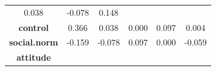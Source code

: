 \documentclass[]{article}
\theoremstyle{definition}
\theoremstyle{definition}
\theoremstyle{definition}
\theoremstyle{remark}
\begin{document}
\begin{longtable}[]{@{}cccccc@{}}
\begin{minipage}[t]{0.11\columnwidth}
0.038\strut
\end{minipage} & \begin{minipage}[t]{0.15\columnwidth}\centering\strut
-0.078\strut
\end{minipage} & \begin{minipage}[t]{0.11\columnwidth}\centering\strut
0.148\strut
\end{minipage}\tabularnewline
\begin{minipage}[t]{0.20\columnwidth}\centering\strut
\textbf{control}\strut
\end{minipage} & \begin{minipage}[t]{0.13\columnwidth}\centering\strut
0.366\strut
\end{minipage} & \begin{minipage}[t]{0.13\columnwidth}\centering\strut
0.038\strut
\end{minipage} & \begin{minipage}[t]{0.11\columnwidth}\centering\strut
0.000\strut
\end{minipage} & \begin{minipage}[t]{0.15\columnwidth}\centering\strut
0.097\strut
\end{minipage} & \begin{minipage}[t]{0.11\columnwidth}\centering\strut
0.004\strut
\end{minipage}\tabularnewline
\begin{minipage}[t]{0.20\columnwidth}\centering\strut
\textbf{social.norm}\strut
\end{minipage} & \begin{minipage}[t]{0.13\columnwidth}\centering\strut
-0.159\strut
\end{minipage} & \begin{minipage}[t]{0.13\columnwidth}\centering\strut
-0.078\strut
\end{minipage} & \begin{minipage}[t]{0.11\columnwidth}\centering\strut
0.097\strut
\end{minipage} & \begin{minipage}[t]{0.15\columnwidth}\centering\strut
0.000\strut
\end{minipage} & \begin{minipage}[t]{0.11\columnwidth}\centering\strut
-0.059\strut
\end{minipage}\tabularnewline
\begin{minipage}[t]{0.20\columnwidth}\centering\strut
\textbf{attitude}\strut
\end{minipage} & \begin{minipage}[t]{0.13\columnwidth}\centering\strut

\end{minipage}
\end{longtable}
\end{document}
